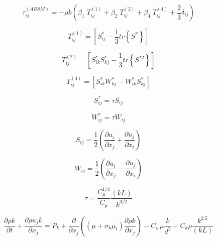 

\begin{equation}
\tau _{ij}^{(ARSM)} =  - \rho k\left( {{\beta _1}\;{T_{ij}^{(1)}} + {\beta _2}\;{T_{ij}^{(2)}} + 
{\beta _4}\;{T_{ij}^{(4)}} + \frac{2}{3}{\delta _{ij}}} \right)
\end{equation}

\begin{equation}
{T_{ij}^{(1)}} = \left[ {{S_{ij}^*} - \frac{1}{3}tr\left\{ {{S^*}} \right\}} \right]
\end{equation}

\begin{equation}
{T_{ij}^{(2)}} = \left[ {{S_{ik}^*S_{kj}^*} - \frac{1}{3}tr\left\{ {{S^{*2}}} \right\}} \right]
\end{equation}

\begin{equation}
{T_{ij}^{(4)}} = \left[ {{S_{ik}^*}{W_{kj}^*} - {W_{ik}^*}{S_{kj}^*}} \right]
\end{equation}

\begin{equation}
{S_{ij}^*} = \tau S_{ij}
\end{equation}
 
\begin{equation}
{W_{ij}^*} = \tau W_{ij}
\end{equation}

\begin{equation}
{S_{ij}} = \frac{1}{2} \left( \frac{\partial u_i}{\partial x_j} 
             + \frac{\partial u_j}{\partial x_i}\right)
\end{equation}
 
\begin{equation}
{W_{ij}} = \frac{1}{2} \left( \frac{\partial u_i}{\partial x_j} 
             - \frac{\partial u_j}{\partial x_i}\right)
\end{equation}

\begin{equation}
\tau  = \frac{{C_\mu ^{1/4}}}{{{C_\mu }}}\frac{{(kL)}}{{{k^{3/2}}}}
\end{equation}
 
\begin{equation}
\frac{{\partial \rho k}}{{\partial t}} + \frac{{\partial \rho {u_j}k}}{{\partial {x_j}}} 
   = {{P_k} + \frac{\partial }{{\partial {x_j}}}\left( {\left( {{\mu} + 
   {\sigma _{k}}{\mu _t}} \right)\frac{{\partial \rho k}}{{\partial {x_j}}}} \right)  - 
   C_w{\mu}\frac{k}{{{d^2}}}} - {C_{k}}\rho \frac{{{k^{2.5}}}}{{(kL)}}
\end{equation}

